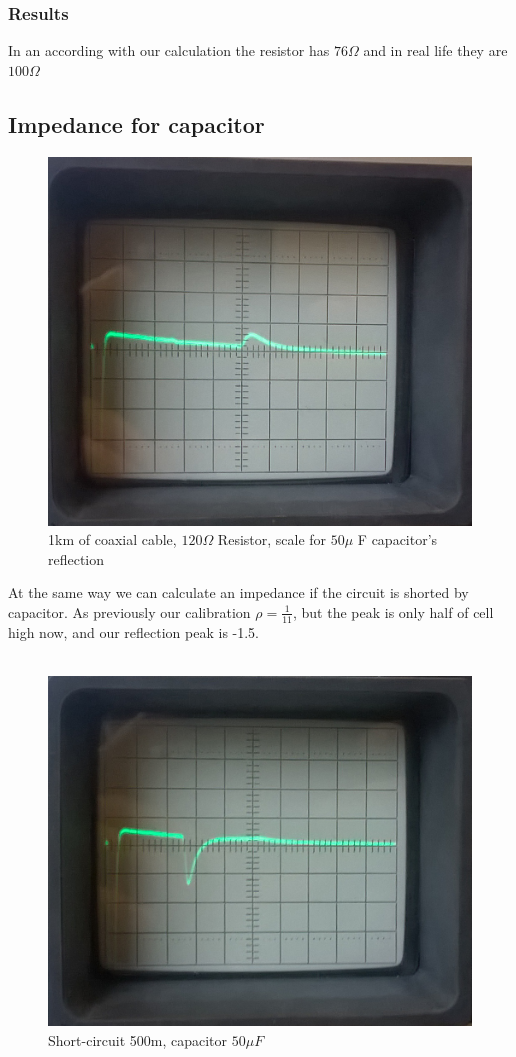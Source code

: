 \documentclass[english]{article}
\begin{document}
\subsubsection{Results}
 In an according with our calculation the resistor has $76\Omega$ and in real life they are
  $100\Omega$
\subsection{Impedance for capacitor}
\begin{figure}[H]
\centerline{\includegraphics[scale=0.25]{Radar/13}}
\caption{1km of coaxial cable, $120 \Omega$ Resistor, scale for $50\mu$ F capacitor's reflection}
\end{figure}
At the same way we can calculate an impedance if the circuit is shorted by capacitor. As previously our calibration $\rho=\frac{1}{11}$, but the peak is only half of cell high now, and our reflection peak is -1.5. \\\\
\begin{figure}[H]
\centerline{\includegraphics[scale=0.3]{Radar/11}}
\caption{Short-circuit 500m, capacitor $50 \mu F$}
\end{figure}
\end{document}
